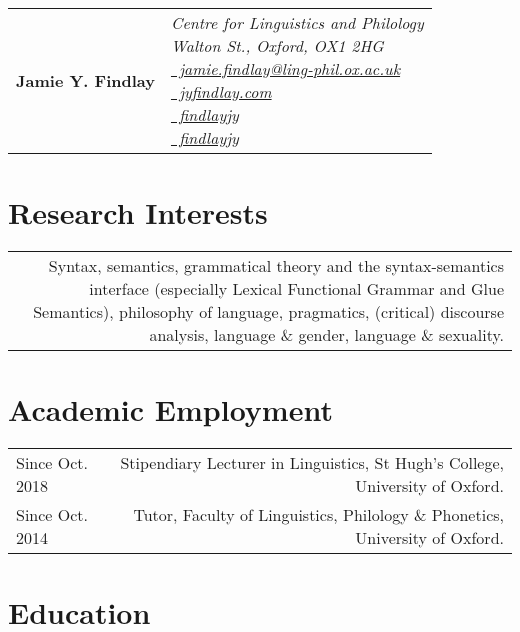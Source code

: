 \documentclass[11pt,a4paper,twoside]{article}
\makeatletter
\newcommand{\name}{Jamie Y. Findlay}
\newenvironment{cvsection}{%
  \setlength{\extrarowheight}{0.70ex}
  \begin{longtable}[l]{@{} L R @{}}
}{%
  \end{longtable}
}
\newcommand{\icon}[1]{\raisebox{-.2\dp\strutbox}{#1}} %
\newcommand{\ContactInfo}[1]{%
\parbox[c]{\hsize}{\raggedleft\footnotesize\it%
#1}%
}
\makeatother
\begin{document}
\thispagestyle{first}

\begin{tabularx}{\linewidth}{@{}lX@{}}
{\Huge\textbf{\name}}%
&\ContactInfo{%
Centre for Linguistics and Philology\\
Walton St., Oxford, OX1 2HG\\
 \href{mailto:jamie.findlay@ling-phil.ox.ac.uk}{{\icon{\faEnvelopeO}\ jamie.findlay@ling-phil.ox.ac.uk}}\\
 \href{http://jyfindlay.com}{\icon{\faChain}\ jyfindlay.com}\\
 \href{http://www.linkedin.com/in/findlayjy}{\icon{\faLinkedinSquare}\ findlayjy}\\
 \href{https://github.com/findlayjy}{\icon{\faGithub}\ findlayjy}
}
\end{tabularx}


\section*{Research Interests}

\begin{cvsection}
    &
     Syntax, semantics, grammatical theory and the syntax-semantics interface (especially Lexical Functional Grammar and Glue Semantics), philosophy of language, pragmatics, (critical) discourse analysis, language \& gender, language \& sexuality.
\end{cvsection}


\section*{Academic Employment}

\begin{cvsection}
  Since Oct. 2018 & Stipendiary Lecturer in Linguistics, St Hugh's College, University of Oxford.\\
  Since Oct. 2014 & Tutor, Faculty of Linguistics, Philology \& Phonetics, University of Oxford.\\
\end{cvsection}


\section*{Education}
\end{document}
